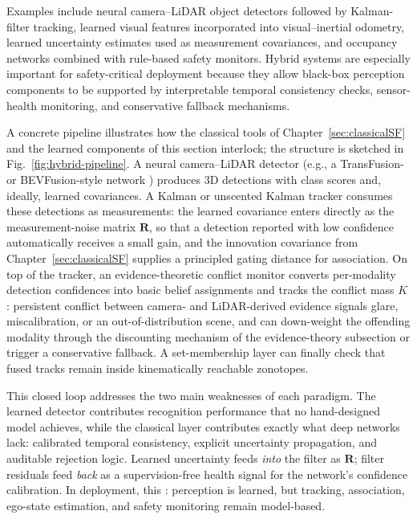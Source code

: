 Examples include neural camera--LiDAR object detectors followed by Kalman-filter tracking, learned visual features incorporated into visual--inertial odometry, learned uncertainty estimates used as measurement covariances, and occupancy networks combined with rule-based safety monitors. Hybrid systems are especially important for safety-critical deployment because they allow black-box perception components to be supported by interpretable temporal consistency checks, sensor-health monitoring, and conservative fallback mechanisms.


A concrete pipeline illustrates how the classical tools of Chapter~\ref{sec:classicalSF} and the learned components of this section interlock; the structure is sketched in Fig.~\ref{fig:hybrid-pipeline}. A neural camera--LiDAR detector (e.g., a TransFusion- or BEVFusion-style network \cite{bai2022_transfusion,liu2023_bevfusion}) produces 3D detections with class scores and, ideally, learned covariances. A Kalman or unscented Kalman tracker consumes these detections as measurements: the learned covariance enters directly as the measurement-noise matrix $\mathbf{R}$, so that a detection reported with low confidence automatically receives a small gain, and the innovation covariance from Chapter~\ref{sec:classicalSF} supplies a principled gating distance for association. On top of the tracker, an evidence-theoretic conflict monitor converts per-modality detection confidences into basic belief assignments and tracks the conflict mass $K$: persistent conflict between camera- and LiDAR-derived evidence signals glare, miscalibration, or an out-of-distribution scene, and can down-weight the offending modality through the discounting mechanism of the evidence-theory subsection or trigger a conservative fallback. A set-membership layer can finally check that fused tracks remain inside kinematically reachable zonotopes.

This closed loop addresses the two main weaknesses of each paradigm. The learned detector contributes recognition performance that no hand-designed model achieves, while the classical layer contributes exactly what deep networks lack: calibrated temporal consistency, explicit uncertainty propagation, and auditable rejection logic. Learned uncertainty feeds \emph{into} the filter as $\mathbf{R}$; filter residuals feed \emph{back} as a supervision-free health signal for the network's confidence calibration. In deployment, this : perception is learned, but tracking, association, ego-state estimation, and safety monitoring remain model-based. 

